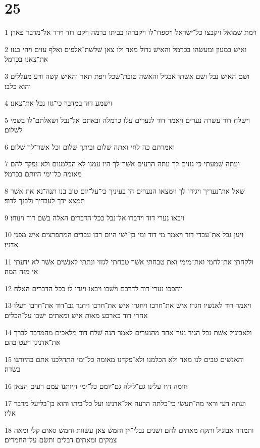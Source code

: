\chapter{25}

\par 1 וימת שׁמואל ויקבצו כל־ישׂראל ויספדו־לו ויקברהו בביתו ברמה ויקם דוד וירד אל־מדבר פארן׃
\par 2 ואישׁ במעון ומעשׂהו בכרמל והאישׁ גדול מאד ולו צאן שׁלשׁת־אלפים ואלף עזים ויהי בגזז את־צאנו בכרמל׃
\par 3 ושׁם האישׁ נבל ושׁם אשׁתו אבגיל והאשׁה טובת־שׂכל ויפת תאר והאישׁ קשׁה ורע מעללים והוא כלבו׃
\par 4 וישׁמע דוד במדבר כי־גזז נבל את־צאנו׃
\par 5 וישׁלח דוד עשׂרה נערים ויאמר דוד לנערים עלו כרמלה ובאתם אל־נבל ושׁאלתם־לו בשׁמי לשׁלום׃
\par 6 ואמרתם כה לחי ואתה שׁלום וביתך שׁלום וכל אשׁר־לך שׁלום׃
\par 7 ועתה שׁמעתי כי גזזים לך עתה הרעים אשׁר־לך היו עמנו לא הכלמנום ולא־נפקד להם מאומה כל־ימי היותם בכרמל׃
\par 8 שׁאל את־נעריך ויגידו לך וימצאו הנערים חן בעיניך כי־על־יום טוב בנו תנה־נא את אשׁר תמצא ידך לעבדיך ולבנך לדוד׃
\par 9 ויבאו נערי דוד וידברו אל־נבל ככל־הדברים האלה בשׁם דוד וינוחו׃
\par 10 ויען נבל את־עבדי דוד ויאמר מי דוד ומי בן־ישׁי היום רבו עבדים המתפרצים אישׁ מפני אדניו׃
\par 11 ולקחתי את־לחמי ואת־מימי ואת טבחתי אשׁר טבחתי לגזזי ונתתי לאנשׁים אשׁר לא ידעתי אי מזה המה׃
\par 12 ויהפכו נערי־דוד לדרכם וישׁבו ויבאו ויגדו לו ככל הדברים האלה׃
\par 13 ויאמר דוד לאנשׁיו חגרו אישׁ את־חרבו ויחגרו אישׁ את־חרבו ויחגר גם־דוד את־חרבו ויעלו אחרי דוד כארבע מאות אישׁ ומאתים ישׁבו על־הכלים׃
\par 14 ולאביגיל אשׁת נבל הגיד נער־אחד מהנערים לאמר הנה שׁלח דוד מלאכים מהמדבר לברך את־אדנינו ויעט בהם׃
\par 15 והאנשׁים טבים לנו מאד ולא הכלמנו ולא־פקדנו מאומה כל־ימי התהלכנו אתם בהיותנו בשׂדה׃
\par 16 חומה היו עלינו גם־לילה גם־יומם כל־ימי היותנו עמם רעים הצאן׃
\par 17 ועתה דעי וראי מה־תעשׂי כי־כלתה הרעה אל־אדנינו ועל כל־ביתו והוא בן־בליעל מדבר אליו׃
\par 18 ותמהר אבוגיל ותקח מאתים לחם ושׁנים נבלי־יין וחמשׁ צאן עשׂוות וחמשׁ סאים קלי ומאה צמקים ומאתים דבלים ותשׂם על־החמרים׃
